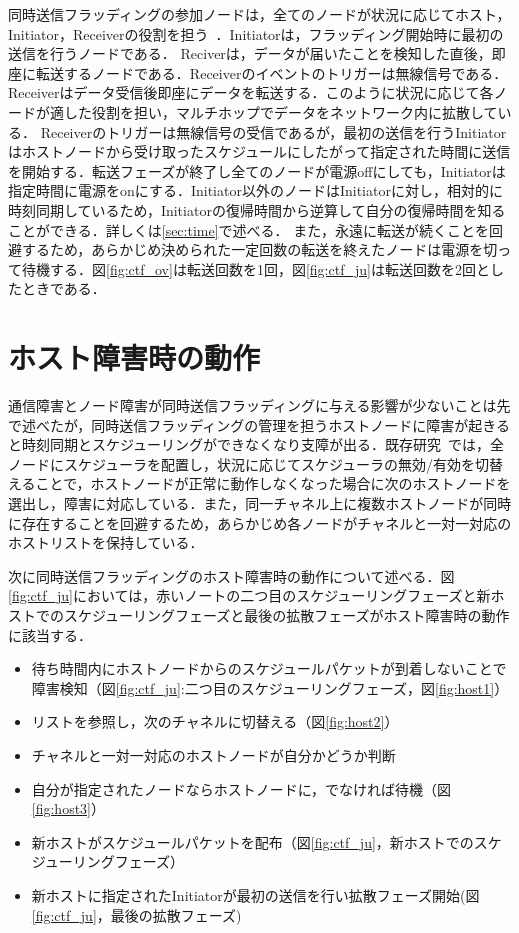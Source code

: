 同時送信フラッディングの参加ノードは，全てのノードが状況に応じてホスト，Initiator，Receiverの役割を担う~\cite{Effi}．Initiatorは，フラッディング開始時に最初の送信を行うノードである．
Reciverは，データが届いたことを検知した直後，即座に転送するノードである．Receiverのイベントのトリガーは無線信号である．Receiverはデータ受信後即座にデータを転送する．このように状況に応じて各ノードが適した役割を担い，マルチホップでデータをネットワーク内に拡散している．
Receiverのトリガーは無線信号の受信であるが，最初の送信を行うInitiatorはホストノードから受け取ったスケジュールにしたがって指定された時間に送信を開始する．転送フェーズが終了し全てのノードが電源offにしても，Initiatorは指定時間に電源をonにする．Initiator以外のノードはInitiatorに対し，相対的に時刻同期しているため，Initiatorの復帰時間から逆算して自分の復帰時間を知ることができる．詳しくは\ref{sec:time}で述べる．
また，永遠に転送が続くことを回避するため，あらかじめ決められた一定回数の転送を終えたノードは電源を切って待機する．図\ref{fig:ctf_ov}は転送回数を1回，図\ref{fig:ctf_ju}は転送回数を2回としたときである．

\section{ホスト障害時の動作}

通信障害とノード障害が同時送信フラッディングに与える影響が少ないことは先で述べたが，同時送信フラッディングの管理を担うホストノードに障害が起きると時刻同期とスケジューリングができなくなり支障が出る．既存研究~\cite{lowpower}では，全ノードにスケジューラを配置し，状況に応じてスケジューラの無効/有効を切替えることで，ホストノードが正常に動作しなくなった場合に次のホストノードを選出し，障害に対応している．また，同一チャネル上に複数ホストノードが同時に存在することを回避するため，あらかじめ各ノードがチャネルと一対一対応のホストリストを保持している．

次に同時送信フラッディングのホスト障害時の動作について述べる．図\ref{fig:ctf_ju}においては，赤いノートの二つ目のスケジューリングフェーズと新ホストでのスケジューリングフェーズと最後の拡散フェーズがホスト障害時の動作に該当する．
 
 \begin{itemize}
    \item 待ち時間内にホストノードからのスケジュールパケットが到着しないことで障害検知（図\ref{fig:ctf_ju}:二つ目のスケジューリングフェーズ，図\ref{fig:host1}）
    \item リストを参照し，次のチャネルに切替える（図\ref{fig:host2}）
    \item チャネルと一対一対応のホストノードが自分かどうか判断
    \item 自分が指定されたノードならホストノードに，でなければ待機（図\ref{fig:host3}）
    \item 新ホストがスケジュールパケットを配布（図\ref{fig:ctf_ju}，新ホストでのスケジューリングフェーズ）
    \item 新ホストに指定されたInitiatorが最初の送信を行い拡散フェーズ開始(図\ref{fig:ctf_ju}，最後の拡散フェーズ)
\end{itemize}

